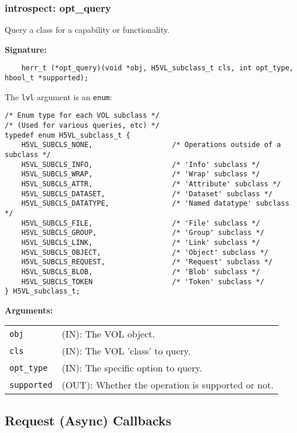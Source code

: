 \subsubsection{introspect: opt\_query}
Query a class for a capability or functionality.

\begin{mdframed}[style=bgbox]
\textbf{Signature:}
\begin{lstlisting}
    herr_t (*opt_query)(void *obj, H5VL_subclass_t cls, int opt_type, hbool_t *supported);
\end{lstlisting}

The \texttt{lvl} argument is an \texttt{enum}:
\begin{lstlisting}
/* Enum type for each VOL subclass */
/* (Used for various queries, etc) */
typedef enum H5VL_subclass_t {
    H5VL_SUBCLS_NONE,                   /* Operations outside of a subclass */
    H5VL_SUBCLS_INFO,                   /* 'Info' subclass */
    H5VL_SUBCLS_WRAP,                   /* 'Wrap' subclass */
    H5VL_SUBCLS_ATTR,                   /* 'Attribute' subclass */
    H5VL_SUBCLS_DATASET,                /* 'Dataset' subclass */
    H5VL_SUBCLS_DATATYPE,               /* 'Named datatype' subclass */
    H5VL_SUBCLS_FILE,                   /* 'File' subclass */
    H5VL_SUBCLS_GROUP,                  /* 'Group' subclass */
    H5VL_SUBCLS_LINK,                   /* 'Link' subclass */
    H5VL_SUBCLS_OBJECT,                 /* 'Object' subclass */
    H5VL_SUBCLS_REQUEST,                /* 'Request' subclass */
    H5VL_SUBCLS_BLOB,                   /* 'Blob' subclass */
    H5VL_SUBCLS_TOKEN                   /* 'Token' subclass */
} H5VL_subclass_t;
\end{lstlisting}

\textbf{Arguments:}\\
\begin{tabular}{l p{13.5cm}}
  \texttt{obj} & (IN): The VOL object.\\
  \texttt{cls} & (IN): The VOL 'class' to query.\\
  \texttt{opt\_type} & (IN): The specific option to query.\\
  \texttt{supported} & (OUT): Whether the operation is supported or not.\\
\end{tabular}
\end{mdframed}



\subsection{Request (Async) Callbacks}

